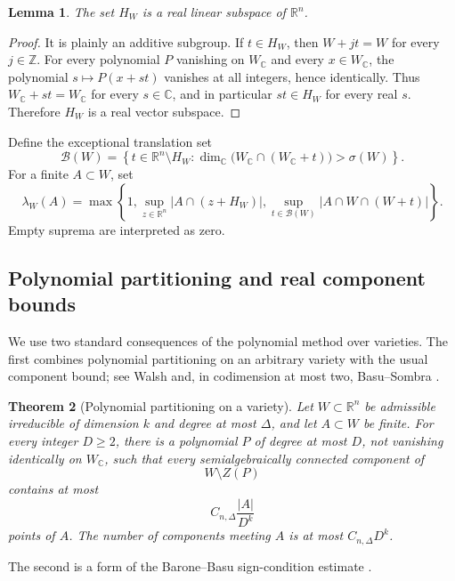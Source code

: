 \documentclass[11pt]{amsart}
\numberwithin{equation}{section}
\newtheorem{theorem}{Theorem}[section]
\newtheorem{lemma}[theorem]{Lemma}
\theoremstyle{definition}
\theoremstyle{remark}
\newcommand{\R}{\mathbb R}
\newcommand{\C}{\mathbb C}
\newcommand{\Z}{\mathbb Z}
\newcommand{\cB}{\mathcal B}
\newcommand{\1}{\mathbf 1}
\newcommand{\card}[1]{\lvert #1\rvert}
\begin{document}
\begin{lemma}\label{lem:stabilizer-linear}
The set $H_W$ is a real linear subspace of $\R^n$.
\end{lemma}

\begin{proof}
It is plainly an additive subgroup.  If $t\in H_W$, then $W+jt=W$ for every $j\in\Z$.  For every polynomial $P$ vanishing on $W_{\C}$ and every $x\in W_{\C}$, the polynomial $s\mapsto P(x+st)$ vanishes at all integers, hence identically.  Thus $W_{\C}+st=W_{\C}$ for every $s\in\C$, and in particular $st\in H_W$ for every real $s$.  Therefore $H_W$ is a real vector subspace.
\end{proof}

Define the exceptional translation set
\begin{equation}\label{eq:bad-set}
 \cB(W)=\left\{t\in\R^n\setminus H_W:
 \dim_{\C}\bigl(W_{\C}\cap(W_{\C}+t)\bigr)>\sigma(W)
 \right\}.
\end{equation}
For a finite $A\subset W$, set
\begin{equation}\label{eq:lambda-W}
 \lambda_W(A)=\max\left\{
 1,
 \sup_{z\in\R^n}\card{A\cap(z+H_W)},
 \sup_{t\in\cB(W)}\card{A\cap W\cap(W+t)}
 \right\}.
\end{equation}
Empty suprema are interpreted as zero.

\subsection{Polynomial partitioning and real component bounds}
We use two standard consequences of the polynomial method over varieties.  The first combines polynomial partitioning on an arbitrary variety with the usual component bound; see Walsh \cite{Walsh} and, in codimension at most two, Basu--Sombra \cite{BasuSombra}.

\begin{theorem}[Polynomial partitioning on a variety]\label{thm:partitioning-variety}
Let $W\subset\R^n$ be admissible irreducible of dimension $k$ and degree at most $\Delta$, and let $A\subset W$ be finite.  For every integer $D\geq2$, there is a polynomial $P$ of degree at most $D$, not vanishing identically on $W_{\C}$, such that every semialgebraically connected component of
\[
 W\setminus Z(P)
\]
contains at most
\[
 C_{n,\Delta}\frac{\card A}{D^k}
\]
points of $A$.  The number of components meeting $A$ is at most $C_{n,\Delta}D^k$.
\end{theorem}

The second is a form of the Barone--Basu sign-condition estimate \cite{BaroneBasu}.
\end{document}
